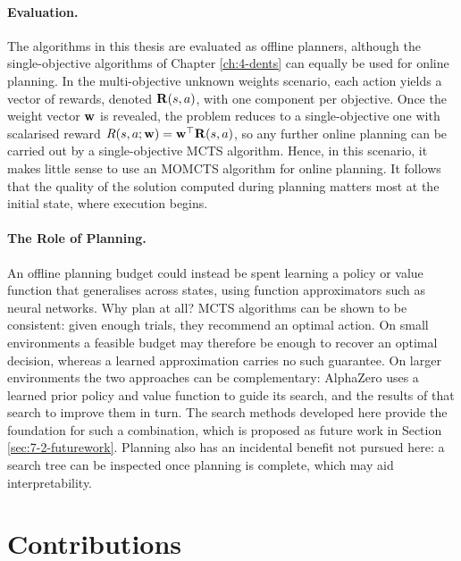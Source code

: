     \paragraph{Evaluation.} The algorithms in this thesis are evaluated as offline planners, although the single-objective algorithms of Chapter \ref{ch:4-dents} can equally be used for online planning. In the multi-objective unknown weights scenario, each action yields a vector of rewards, denoted $\mathbf{R}(s,a)$, with one component per objective. Once the weight vector $\mathbf{w}$ is revealed, the problem reduces to a single-objective one with scalarised reward $R(s,a;\mathbf{w}) = \mathbf{w}^\top \mathbf{R}(s,a)$, so any further online planning can be carried out by a single-objective MCTS algorithm. Hence, in this scenario, it makes little sense to use an MOMCTS algorithm for online planning. It follows that the quality of the solution computed during planning matters most at the initial state, where execution begins.

    \paragraph{The Role of Planning.} An offline planning budget could instead be spent learning a policy or value function that generalises across states, using function approximators such as neural networks. Why plan at all? MCTS algorithms can be shown to be consistent: given enough trials, they recommend an optimal action. On small environments a feasible budget may therefore be enough to recover an optimal decision, whereas a learned approximation carries no such guarantee. On larger environments the two approaches can be complementary: AlphaZero \cite{alpha_zero} uses a learned prior policy and value function to guide its search, and the results of that search to improve them in turn. The search methods developed here provide the foundation for such a combination, which is proposed as future work in Section \ref{sec:7-2-futurework}. Planning also has an incidental benefit not pursued here: a search tree can be inspected once planning is complete, which may aid interpretability. 



\section{Contributions}
\label{sec:1-3-contributions}

